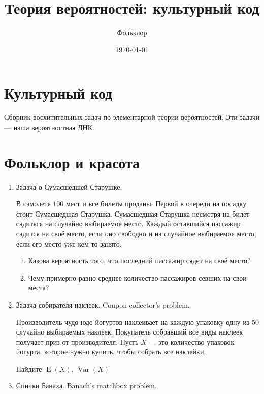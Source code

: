 \documentclass[12pt,a4paper]{article}
\title{Теория вероятностей: культурный код}
\author{Фольклор}
\date{\today}
\DeclareMathOperator{\Var}{Var}
\DeclareMathOperator{\E}{E}
\begin{document}
\maketitle

\section{Культурный код}

Сборник восхитительных задач по элементарной теории вероятностей. Эти задачи --- наша вероятностная ДНК.

\section{Фольклор и красота}


\begin{enumerate}
\item Задача о Сумасшедшей Старушке.

В самолете $100$ мест и все билеты проданы. Первой в очереди на посадку стоит Сумасшедшая Старушка. Сумасшедшая Старушка несмотря на билет садиться на случайно выбираемое место. Каждый оставшийся пассажир садится на своё место, если оно свободно и на случайное выбираемое место, если его место уже кем-то занято.

\begin{enumerate}
\item Какова вероятность того, что последний пассажир сядет на своё место?
\item Чему примерно равно среднее количество пассажиров севших на свои места?
\end{enumerate}


\item Задача собирателя наклеек. Coupon collector's problem. 

Производитель чудо-юдо-йогуртов наклеивает на каждую упаковку одну из 50 случайно выбираемых наклеек. Покупатель собравший все виды наклеек получает приз от производителя. Пусть $X$ --- это количество упаковок йогурта, которое нужно купить, чтобы собрать все наклейки.

Найдите  $\E(X)$, $\Var(X)$

\item Спички Банаха. Banach's matchbox problem.


\end{enumerate}
\end{document}
